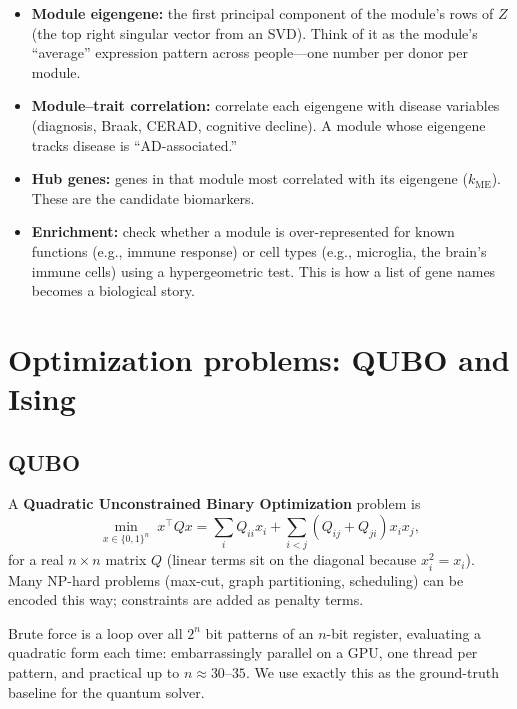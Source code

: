 \documentclass[11pt]{article}
\begin{document}
\begin{itemize}[nosep]
  \item \textbf{Module eigengene:} the first principal component of the
        module's rows of $Z$ (the top right singular vector from an SVD).
        Think of it as the module's ``average'' expression pattern across
        people---one number per donor per module.
  \item \textbf{Module--trait correlation:} correlate each eigengene with
        disease variables (diagnosis, Braak, CERAD, cognitive decline). A
        module whose eigengene tracks disease is ``AD-associated.''
  \item \textbf{Hub genes:} genes in that module most correlated with its
        eigengene ($k_{\text{ME}}$). These are the candidate biomarkers.
  \item \textbf{Enrichment:} check whether a module is over-represented for
        known functions (e.g., immune response) or cell types (e.g.,
        microglia, the brain's immune cells) using a hypergeometric test.
        This is how a list of gene names becomes a biological story.
\end{itemize}

\section{Optimization problems: QUBO and Ising}

\subsection{QUBO}

A \textbf{Quadratic Unconstrained Binary Optimization} problem is
\[
\min_{x\in\{0,1\}^n} \; x^{\top} Q x = \sum_{i} Q_{ii}x_i + \sum_{i<j}
(Q_{ij}+Q_{ji}) x_i x_j,
\]
for a real $n\times n$ matrix $Q$ (linear terms sit on the diagonal because
$x_i^2 = x_i$). Many NP-hard problems (max-cut, graph partitioning, scheduling)
can be encoded this way; constraints are added as penalty terms.

\begin{analogy}
Brute force is a loop over all $2^n$ bit patterns of an $n$-bit register,
evaluating a quadratic form each time: embarrassingly parallel on a GPU, one
thread per pattern, and practical up to $n\approx 30$--$35$. We use exactly
this as the ground-truth baseline for the quantum solver.
\end{analogy}
\end{document}
